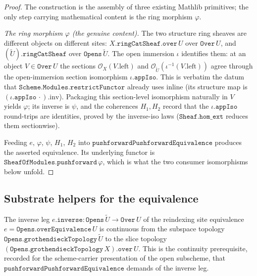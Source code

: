 \begin{proof}
  \leanok

  The construction is the assembly of three existing Mathlib primitives; the only
  step carrying mathematical content is the ring morphism \(\varphi\).

  \emph{The ring morphism \(\varphi\) (the genuine content).} The two structure
  ring sheaves are different objects on different sites:
  \(X.\mathtt{ringCatSheaf}.\mathtt{over}\,U\) over \(\mathtt{Over}\,U\), and
  \((\widetilde{U}).\mathtt{ringCatSheaf}\) over \(\mathtt{Opens}\,\widetilde{U}\).
  The open immersion \(\iota\) identifies them: at an object \(V \in
  \mathtt{Over}\,U\) the sections \(\mathcal{O}_X(V.\mathrm{left})\) and
  \(\mathcal{O}_{\widetilde{U}}(\iota^{-1}(V.\mathrm{left}))\) agree through the
  open-immersion section isomorphism \(\iota.\mathtt{appIso}\). This is verbatim the
  datum that \(\mathtt{Scheme.Modules.restrictFunctor}\) already uses inline
  (its structure map is \((\iota.\mathtt{appIso}\,\cdot).\mathrm{inv}\)). Packaging
  this section-level isomorphism naturally in \(V\) yields \(\varphi\); its inverse
  is \(\psi\), and the coherences \(H_1, H_2\) record that the
  \(\iota.\mathtt{appIso}\) round-trips are identities, proved by the
  inverse-iso laws (\(\mathtt{Sheaf.hom\_ext}\) reduces them sectionwise).

  Feeding \(e\), \(\varphi\), \(\psi\), \(H_1\), \(H_2\) into
  \(\mathtt{pushforwardPushforwardEquivalence}\) produces the asserted equivalence.
  Its underlying functor is \(\mathtt{SheafOfModules.pushforward}\,\varphi\), which
  is what the two consumer isomorphisms below unfold.
\end{proof}

\subsection{Substrate helpers for the equivalence}
\label{mk-sec:soe_equivalence_helpers}

\begin{definition}\label{mk-def:over_equiv_inverse_is_continuous}
  \leanok

  The inverse leg \(e.\mathtt{inverse} : \mathtt{Opens}\,\widetilde{U} \to
  \mathtt{Over}\,U\) of the reindexing site equivalence
  \(e = \mathtt{Opens.overEquivalence}\,U\) is continuous from the subspace
  topology \(\mathtt{Opens.grothendieckTopology}\,\widetilde{U}\) to the slice
  topology \((\mathtt{Opens.grothendieckTopology}\,X).\mathtt{over}\,U\). This is the
  continuity prerequisite, recorded for the scheme-carrier presentation of the
  open subscheme, that \(\mathtt{pushforwardPushforwardEquivalence}\) demands of the
  inverse leg.
\end{definition}

